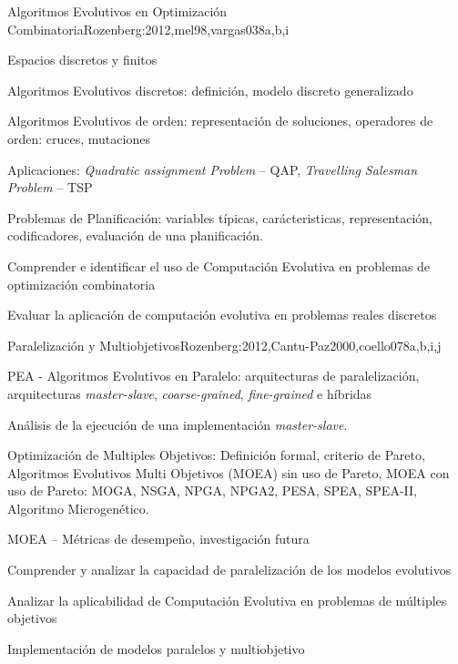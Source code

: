 \begin{syllabus}
\begin{unit}{Algoritmos Evolutivos en Optimización Combinatoria}{Rozenberg:2012,mel98,vargas03}{8}{a,b,i}
\begin{topics}
  \item Espacios discretos y finitos
	\item Algoritmos Evolutivos discretos: definición, modelo discreto generalizado
  \item Algoritmos Evolutivos de orden: representación de soluciones, operadores de orden: cruces, mutaciones
	\item Aplicaciones: \textit{Quadratic assignment Problem} -- QAP, \textit{Travelling Salesman Problem} -- TSP
	\item Problemas de Planificación: variables típicas, carácteristicas, representación, codificadores, evaluación de una planificación. 
\end{topics}
\begin{learningoutcomes}
  \item Comprender e identificar el uso de Computación Evolutiva en problemas de optimización combinatoria
  \item Evaluar la aplicación de computación evolutiva en problemas reales discretos
\end{learningoutcomes}
\end{unit}

\begin{unit}{Paralelización y Multiobjetivos}{Rozenberg:2012,Cantu-Paz2000,coello07}{8}{a,b,i,j}
\begin{topics}
  \item PEA - Algoritmos Evolutivos en Paralelo: arquitecturas de paralelización, arquitecturas \textit{master-slave}, \textit{coarse-grained}, \textit{fine-grained} e híbridas 
  \item Análisis de la ejecución de una implementación \textit{master-slave}.
  \item Optimización de Multiples Objetivos: Definición formal, criterio de Pareto, Algoritmos Evolutivos Multi Objetivos (MOEA) sin uso de Pareto, MOEA con uso de Pareto: MOGA, NSGA, NPGA, NPGA2, PESA, SPEA, SPEA-II, Algoritmo Microgenético. 
	\item MOEA -- Métricas de desempeño, investigación futura
\end{topics}
\begin{learningoutcomes}
  \item Comprender y analizar la capacidad de paralelización de los modelos evolutivos
  \item Analizar la aplicabilidad de Computación Evolutiva en problemas de múltiples objetivos
  \item Implementación de modelos paralelos y multiobjetivo
\end{learningoutcomes}
\end{unit}


\end{syllabus}
